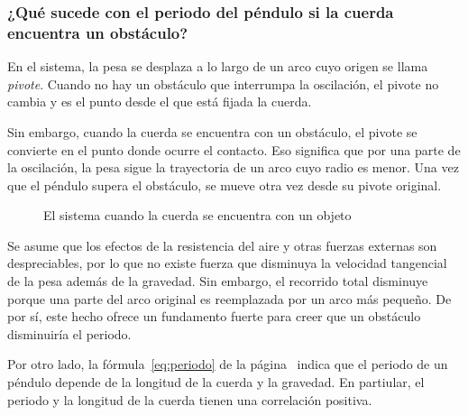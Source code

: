\documentclass[twocolumn]{article}
\numberwithin{table}{section}
\begin{document}
\subsubsection*{¿Qué sucede con el periodo del péndulo si la cuerda
encuentra un obstáculo?}

En el sistema, la pesa se desplaza a lo largo de un arco cuyo origen
se llama \emph{pivote}. Cuando no hay un obstáculo que interrumpa la
oscilación, el pivote no cambia y es el punto desde el que está
fijada la cuerda.

Sin embargo, cuando la cuerda se encuentra con un obstáculo, el
pivote se convierte en el punto donde ocurre el contacto. Eso
significa que por una parte de la oscilación, la pesa sigue la
trayectoria de un arco cuyo radio es menor. Una vez que el péndulo
supera el obstáculo, se mueve otra vez desde su pivote original.

\begin{figure}[h]
  \centering
  \caption{El sistema cuando la cuerda se encuentra con un objeto}
\end{figure}

Se asume que los efectos de la resistencia del aire y otras fuerzas
externas son despreciables, por lo que no existe fuerza que disminuya
la velocidad tangencial de la pesa además de la gravedad. Sin
embargo, el recorrido total disminuye porque una parte del arco
original es reemplazada por un arco más pequeño. De por sí, este
hecho ofrece un fundamento fuerte para creer que un obstáculo
disminuiría el periodo.

Por otro lado, la fórmula~\eqref{eq:periodo} de la
página~\pageref{eq:periodo} indica que el periodo de un péndulo
depende de la longitud de la cuerda y la gravedad. En partiular, el
periodo y la longitud de la cuerda tienen una correlación positiva.
\end{document}

